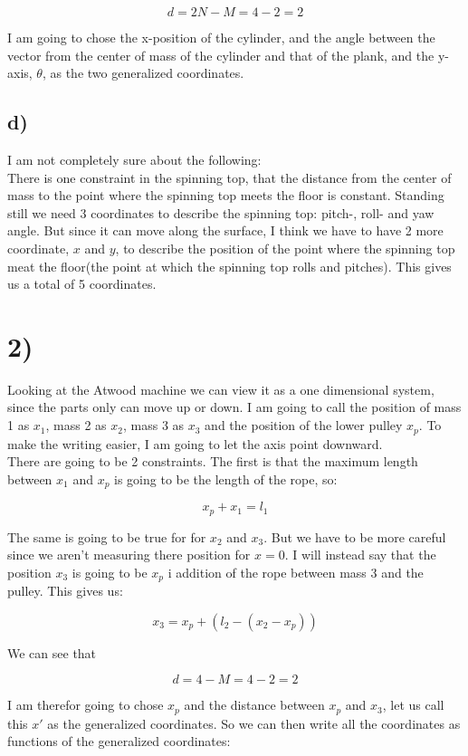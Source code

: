 \documentclass[a4paper,norsk, 10pt]{article}
\begin{document}
$$
d = 2N - M = 4 - 2 = 2
$$

I am going to chose the x-position of the cylinder, and the angle between the vector from the center of mass of the cylinder and that of the plank, and the y-axis, $\theta$, as the two generalized coordinates.

\subsection*{d)}

I am not completely sure about the following:\\

There is one constraint in the spinning top, that the distance from the center of mass to the point where the spinning top meets the floor is constant. Standing still we need 3 coordinates to describe the spinning top: pitch-, roll- and yaw angle. But since it can move along the surface, I think we have to have 2 more coordinate, $x$ and $y$, to describe the position of the point where the spinning top meat the floor(the point at which the spinning top rolls and pitches). This gives us a total of 5 coordinates.

\section*{2)}

Looking at the Atwood machine we can view it as a one dimensional system, since the parts only can move up or down. I am going to call the position of mass 1 as $x_1$, mass 2 as $x_2$, mass 3 as $x_3$ and the position of the lower pulley $x_p$. To make the writing easier, I am going to let the axis point downward.\\

There are going to be 2 constraints. The first is that the maximum length between $x_1$ and $x_p$ is going to be the length of the rope, so:

$$
x_p + x_1 = l_1
$$

The same is going to be true for for $x_2$ and $x_3$. But we have to be more careful since we aren't measuring there position for $x=0$. I will instead say that the position $x_3$ is going to be $x_p$ i addition of the rope between mass 3 and the pulley. This gives us:

$$
x_3 = x_p + (l_2 -(x_2 - x_p))
$$

We can see that 

$$ d = 4-M = 4-2 = 2$$

I am therefor going to chose $x_p$ and the distance between $x_p$ and $x_3$, let us call this $x'$ as the generalized coordinates. So we can then write all the coordinates as functions of the generalized coordinates:
\end{document}
